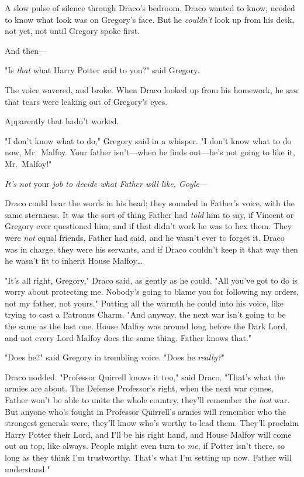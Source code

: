 A slow pulse of silence through Draco's bedroom. Draco wanted to know, needed 
to know what look was on Gregory's face. But he \emph{couldn't} look up from 
his desk, not yet, not until Gregory spoke first.

And then---

"Is \emph{that} what Harry Potter said to you?" said Gregory.

The voice wavered, and broke. When Draco looked up from his homework, he saw 
that tears were leaking out of Gregory's eyes.

Apparently that hadn't worked.

"I don't know what to do," Gregory said in a whisper. "I don't know what to do 
now, Mr.~Malfoy. Your father isn't---when he finds out---he's not going to like 
it, Mr.~Malfoy!"

\emph{It's not} your\emph{ job to decide what Father will like, Goyle---}

Draco could hear the words in his head; they sounded in Father's voice, with 
the same sternness. It was the sort of thing Father had \emph{told} him to say, 
if Vincent or Gregory ever questioned him; and if that didn't work he was to 
hex them. They were \emph{not} equal friends, Father had said, and he wasn't 
ever to forget it. Draco was in charge, they were his servants, and if Draco 
couldn't keep it that way then he wasn't fit to inherit House Malfoy{\ldots}

"It's all right, Gregory," Draco said, as gently as he could. "All you've got 
to do is worry about protecting me. Nobody's going to blame you for following 
my orders, not my father, not yours." Putting all the warmth he could into his 
voice, like trying to cast a Patronus Charm. "And anyway, the next war isn't 
going to be the same as the last one. House Malfoy was around long before the 
Dark Lord, and not every Lord Malfoy does the same thing. Father knows that."

"Does he?" said Gregory in trembling voice. "Does he \emph{really?}"

Draco nodded. "Professor Quirrell knows it too," said Draco. "That's what the 
armies are about. The Defense Professor's right, when the next war comes, 
Father won't be able to unite the whole country, they'll remember the 
\emph{last} war. But anyone who's fought in Professor Quirrell's armies will 
remember who the strongest generals were, they'll know who's worthy to lead 
them. They'll proclaim Harry Potter their Lord, and I'll be his right hand, and 
House Malfoy will come out on top, like always. People might even turn to 
\emph{me,} if Potter isn't there, so long as they think I'm trustworthy. That's 
what I'm setting up now. Father will understand."

